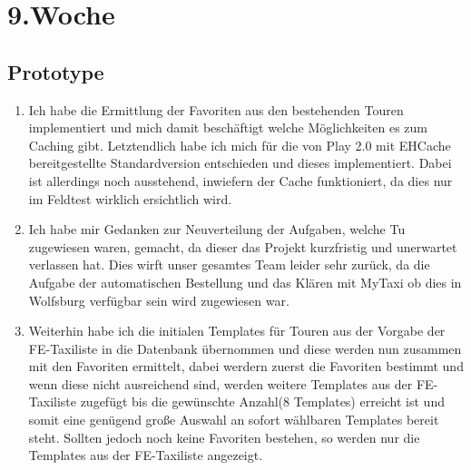 \chapter{9.\hspace{0.5em}Woche}\label{wo9}

\section{Prototype}\label{wo9_1}

\begin{enumerate}[label={\Roman*)}]
	\item Ich habe die Ermittlung der Favoriten aus den bestehenden Touren implementiert und mich damit besch\"aftigt welche
M\"oglichkeiten es zum Caching gibt. Letztendlich habe ich mich f\"ur die von Play 2.0 mit EHCache bereitgestellte
Standardversion entschieden und dieses implementiert. Dabei ist allerdings noch ausstehend, inwiefern der Cache funktioniert, da
dies nur im Feldtest wirklich ersichtlich wird.
	\item Ich habe mir Gedanken zur Neuverteilung der Aufgaben, welche Tu zugewiesen waren, gemacht, da dieser das Projekt
kurzfristig und unerwartet verlassen hat. Dies wirft unser gesamtes Team leider sehr zur\"uck, da die Aufgabe der automatischen
Bestellung und das Kl\"aren mit MyTaxi ob dies in Wolfsburg verf\"ugbar sein wird zugewiesen war.
	\item Weiterhin habe ich die initialen Templates f\"ur Touren aus der Vorgabe der FE-Taxiliste in die Datenbank
\"ubernommen und diese werden nun zusammen mit den Favoriten ermittelt, dabei werdern zuerst die Favoriten bestimmt und wenn
diese nicht ausreichend sind, werden weitere Templates aus der FE-Taxiliste zugef\"ugt bis die gew\"unschte Anzahl(8 Templates)
erreicht ist und somit eine gen\"ugend gro\ss{}e Auswahl an sofort w\"ahlbaren Templates bereit steht. Sollten jedoch noch keine
Favoriten bestehen, so werden nur die Templates aus der FE-Taxiliste angezeigt.
\end{enumerate}